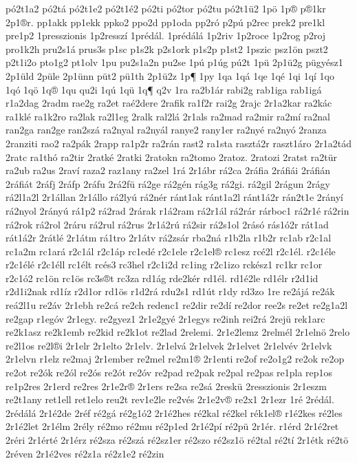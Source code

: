 {pó2t1a2
pó2tá
pó2t1e2
pó2t1é2
pó2ti
pó2tor
pó2tu
pó2t1ü2
1pö
1p®
p®1kr
2p1®r.
pp1akk
pp1ekk
ppko2
ppo2d
pp1oda
pp2ró
p2pú
p2rec
prek2
pre1kl
pre1p2
1presszionis
1p2resszí
1prédál.
1prédálá
1p2riv
1p2roce
1p2rog
p2roj
pro1k2h
pru2s1á
prus3s
p1sc
p1s2k
p2s1ork
p1s2p
p1st2
1pszic
psz1ön
pszt2
p2t1i2o
pto1g2
pt1olv
1pu
pu2s1a2n
pu2se
1pú
p1úg
pú2t
1pü
2p1ü2g
pügyész1
2p1üld
2püle
2p1ünn
püt2
pü1th
2p1ü2z
1p¶
1py
1qa
1qá
1qe
1qé
1qi
1qí
1qo
1qó
1qö
1q®
1qu
qu2i
1qú
1qü
1q¶
q2v
1ra
ra2b1ár
rabi2g
rab1iga
rab1igá
r1a2dag
2radm
rae2g
ra2et
raé2dere
2rafik
ra1f2r
rai2g
2rajc
2r1a2kar
ra2kác
ra1klé
ra1k2ro
ra2lak
ra2l1eg
2ralk
ral2lá
2r1als
ra2mad
ra2mir
ra2mí
ra2nal
ran2ga
ran2ge
ran2szá
ra2nyal
ra2nyál
ranye2
rany1er
ra2nyé
ra2nyó
2ranza
2ranziti
rao2
ra2pák
2rapp
ra1p2r
ra2rán
rast2
ra1sta
rasztá2r
raszt1áro
2r1a2tád
2ratc
ra1thó
ra2tir
2ratké
2ratki
2ratokn
ra2tomo
2ratoz.
2ratozi
2ratst
ra2tür
ra2ub
ra2us
2raví
raza2
raz1any
ra2zel
1rá
2r1ábr
rá2ca
2ráfia
2ráfiái
2ráfián
2ráfiát
2ráfj
2ráfp
2ráfu
2rá2fü
rá2ge
rá2gén
rág3g
rá2gi.
rá2gil
2rágun
2rágy
rá2l1a2l
2r1állan
2r1állo
rá2lyú
rá2nér
ránt1ak
ránt1a2l
ránt1á2r
rán2t1e
2rányí
rá2nyol
2rányú
rá1p2
rá2rad
2rárak
r1á2ram
rá2r1ál
rá2rár
rárboc1
rá2r1é
rá2rin
rá2rok
rá2rol
2ráru
rá2rul
rá2rus
2r1á2rú
rá2sir
rá2s1ol
2rásó
rás1ó2r
rát1ad
rát1á2r
2rátlé
2r1átm
rá1tro
2r1átv
rá2zsár
rba2ná
r1b2la
r1b2r
rc1ab
r2c1al
rc1a2m
rc1ará
r2c1ál
r2c1áp
rc1edé
r2c1ele
r2c1el®
rc1esz
rcé2l
r2c1él.
r2c1éle
r2c1élé
r2c1éll
rc1élt
rcés3
rc3hel
r2c1i2d
rc1ing
r2c1izo
rckész1
rc1kr
rc1or
r2c1ó2
rc1ön
rc1ös
rc3s®t
rc3za
rd1ág
rde2kér
rd1él.
rd1é2le
rd1élr
r2d1id
r2d1i2nak
rd1íz
r2d1or
rd1ös
r1d2rá
rdu2s1
rd1út
r1dy
rd3zo
1re
re2ájá
re2ák
reá2l1u
re2áv
2r1ebh
re2cá
re2ch
redenc1
re2dir
re2dí
re2dor
ree2s
re2et
re2g1a2l
re2gap
r1egóv
2r1egy.
re2gyez1
2r1e2gyé
2r1egys
re2inh
rei2rá
2rejü
rek1arc
re2k1asz
re2k1emb
re2kid
re2k1ot
re2lad
2relemi.
2r1e2lemz
2relmél
2r1elnö
2relo
re2l1os
re2l®i
2r1elr
2r1elto
2r1elv.
2r1elvá
2r1elvek
2r1elvet
2r1elvév
2r1elvk
2r1elvn
r1elz
re2maj
2r1ember
re2mel
re2m1®
2r1enti
re2of
re2o1g2
re2ok
re2op
re2ot
re2ók
re2ól
re2ós
re2ót
re2óv
re2pad
re2pak
re2pal
re2pas
re1pla
rep1os
re1p2res
2r1erd
re2res
2r1e2r®
2r1ers
re2sa
re2sá
2reskü
2resszionis
2r1eszm
re2t1any
ret1ell
ret1elo
reu2t
rev1e2le
re2vés
2r1e2v®
re2x1
2r1ezr
1ré
2rédál.
2rédálá
2r1é2de
2réf
ré2gá
ré2g1ó2
2r1é2hes
ré2kal
ré2kel
rék1el®
r1é2kes
ré2les
2r1é2let
2r1élm
2rély
ré2mo
ré2mu
ré2p1ed
2r1é2pí
ré2pü
2r1ér.
r1érd
2r1é2ret
2réri
2r1érté
2r1érz
ré2sza
ré2szá
ré2sz1er
ré2szo
ré2sz1ö
ré2tal
ré2tí
2r1étk
ré2tö
2réven
2r1é2ves
ré2z1a
ré2z1e2
ré2zin
}
